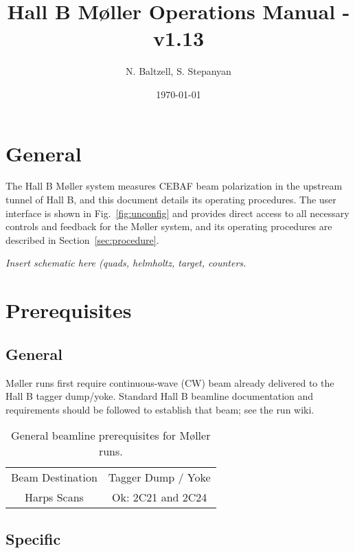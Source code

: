 \documentclass[amsmath,amssymb,notitlepage,12pt]{revtex4}
\begin{document}
\title{Hall B M{\o}ller Operations Manual - v1.13}
\date{\today}
\author{N. Baltzell, S. Stepanyan}
\begin{abstract}
\end{abstract}
\maketitle

\tableofcontents

\newpage 

\section{General}

The Hall B M{\o}ller system measures CEBAF beam polarization in the upstream tunnel of Hall B, and this document details its operating procedures.  The user interface is shown in Fig.~\ref{fig:unconfig} and provides direct access to all necessary controls and feedback for the M{\o}ller system, and its operating procedures are described in Section~\ref{sec:procedure}.

{\em Insert schematic here (quads, helmholtz, target, counters.}

\section{Prerequisites}\label{sec:prereq}

\subsection{General}

M{\o}ller runs first require continuous-wave (CW) beam already delivered to the Hall B tagger dump/yoke.  Standard Hall B beamline documentation and requirements should be followed to establish that beam;  see the run wiki.

\begin{table}[htbp]\centering
    \begin{tabular}{c|c}\toprule[1.5pt]
        Beam Destination & Tagger Dump / Yoke \\
        Harps Scans & Ok: 2C21 and 2C24\\ 
        \bottomrule[1.5pt]
    \end{tabular}
    \caption{General beamline prerequisites for M{\o}ller runs.}
\end{table}

\subsection{Specific}
\end{document}
